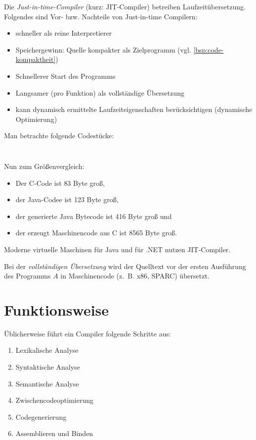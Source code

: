 
Die \textit{Just-in-time-Compiler} (kurz: JIT-Compiler) betreiben
Laufzeitübersetzung. Folgendes sind Vor- bzw. Nachteile von Just-in-time Compilern:
\begin{itemize}
	\item schneller als reine Interpretierer
	\item Speichergewinn: Quelle kompakter als Zielprogramm (vgl. \cref{bsp:code-kompaktheit})
	\item Schnellerer Start des Programms
	\item Langsamer (pro Funktion) als vollständige Übersetzung
	\item kann dynamisch ermittelte Laufzeiteigenschaften berücksichtigen (dynamische Optimierung)
\end{itemize}

\begin{beispiel}\label{bsp:code-kompaktheit}%
    Man betrachte folgende Codestücke:

    \inputminted[linenos, numbersep=5pt, tabsize=4, frame=lines, label=Hello.java]{java}{scripts/java/Hello.java}
    \inputminted[linenos, numbersep=5pt, tabsize=4, frame=lines, label=hello-world.c]{c}{scripts/c/hello-world.c}

    Nun zum Größenvergleich:

    \begin{itemize}
        \item Der C-Code ist 83 Byte groß,
        \item der Java-Codee ist 123 Byte groß, 
        \item der generierte Java Bytecode ist 416 Byte groß und
        \item der erzeugt Maschinencode aus C ist 8565 Byte groß.
    \end{itemize}
\end{beispiel}

Moderne virtuelle Maschinen für Java und für .NET nutzen JIT-Compiler.

Bei der \textit{vollständigen Übersetzung} wird der Quelltext vor der ersten
Ausführung des Programms $A$ in Maschinencode (z.~B. x86, SPARC) übersetzt.


\section{Funktionsweise}
Üblicherweise führt ein Compiler folgende Schritte aus:
\begin{enumerate}
	\item Lexikalische Analyse
	\item Syntaktische Analyse
	\item Semantische Analyse
	\item Zwischencodeoptimierung
	\item Codegenerierung
    \item Assemblieren und Binden
\end{enumerate}

